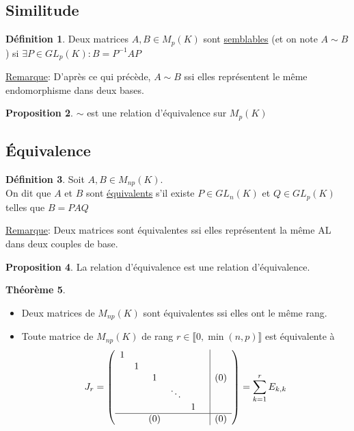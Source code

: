 \documentclass[10pt,a4paper]{article}
\theoremstyle{definition}
\newtheorem{proposition}{Proposition}[section]
\newtheorem{theorem}[proposition]{Théorème}
\newtheorem{definition}[proposition]{Définition}
\begin{document}
\subsection{Similitude}
\begin{definition}
Deux matrices $A, B \in M_p(K)$ sont \uline{semblables} (et on note $A \sim B$) si $\exists P \in GL_p(K) : B = P^{-1}AP$
\end{definition}
\noindent \uline{Remarque}: D'après ce qui précède, $A \sim B$ ssi elles représentent le même endomorphisme dans deux bases.
\begin{proposition}
$\sim$ est une relation d'équivalence sur $M_p(K)$
\end{proposition}

\subsection{Équivalence}
\begin{definition}
Soit $A, B \in M_{np}(K)$. \\
On dit que $A$ et $B$ sont \uline{équivalents} s'il existe $P \in GL_n(K)$ et $Q \in GL_p(K)$ telles que $B = PAQ$
\end{definition}
\noindent \uline{Remarque}: Deux matrices sont équivalentes ssi elles représentent la même AL dans deux couples de base.
\begin{proposition}
La relation d'équivalence est une relation d'équivalence.
\end{proposition}
\begin{theorem}
\hfill
\begin{itemize}
\item Deux matrices de $M_{np}(K)$ sont équivalentes ssi elles ont le même rang.
\item Toute matrice de $M_{np}(K)$ de rang $r \in \llbracket 0, \min (n, p) \rrbracket$ est équivalente à
\[J_r = \left(\begin{array}{cccccc|c}
1 &   &   &   &   &   & \\  
  & 1 &   &   &   &   & \\
  &   & 1 &   &   &   & (0) \\
  &   &   & \ddots  &   &   &\\
  &   &   &   & 1 &   & \\
\hline
  &   & (0) &   &   &   & (0)
\end{array}\right) = \sum\limits_{k = 1}^{r} E_{k, k} \]
\end{itemize}
\end{theorem}
\end{document}
